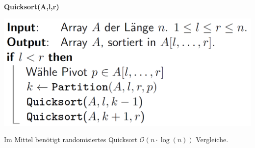 \begin{sectionbox}
\textbf{Quicksort(A,l,r)}\par
\includegraphics[width = 0.8\columnwidth]{../img/QuicksortCode.png}
\par\smallskip
\begin{greenbox}
Im Mittel benötigt randomisiertes Quicksort $\mathcal{O}(n \cdot \operatorname{log}(n))$ Vergleiche.
\end{greenbox}
\end{sectionbox}

